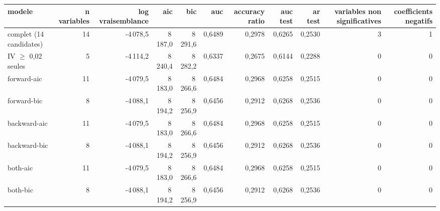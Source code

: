 \begin{tabular}{lrrrrrrrrrr}
\toprule
\textbf{modele} & \textbf{n variables} & \textbf{log vraisemblance} & \textbf{aic} & \textbf{bic} & \textbf{auc} & \textbf{accuracy ratio} & \textbf{auc test} & \textbf{ar test} & \textbf{variables non significatives} & \textbf{coefficients negatifs} \\
\midrule
complet (14 candidates) & 14 & -4\,078,5 & 8\,187,0 & 8\,291,6 & 0,6489 & 0,2978 & 0,6265 & 0,2530 & 3 & 1 \\
IV $\geq$ 0,02 seules & 5 & -4\,114,2 & 8\,240,4 & 8\,282,2 & 0,6337 & 0,2675 & 0,6144 & 0,2288 & 0 & 0 \\
forward-aic & 11 & -4\,079,5 & 8\,183,0 & 8\,266,6 & 0,6484 & 0,2968 & 0,6258 & 0,2515 & 0 & 0 \\
forward-bic & 8 & -4\,088,1 & 8\,194,2 & 8\,256,9 & 0,6456 & 0,2912 & 0,6268 & 0,2536 & 0 & 0 \\
backward-aic & 11 & -4\,079,5 & 8\,183,0 & 8\,266,6 & 0,6484 & 0,2968 & 0,6258 & 0,2515 & 0 & 0 \\
backward-bic & 8 & -4\,088,1 & 8\,194,2 & 8\,256,9 & 0,6456 & 0,2912 & 0,6268 & 0,2536 & 0 & 0 \\
both-aic & 11 & -4\,079,5 & 8\,183,0 & 8\,266,6 & 0,6484 & 0,2968 & 0,6258 & 0,2515 & 0 & 0 \\
both-bic & 8 & -4\,088,1 & 8\,194,2 & 8\,256,9 & 0,6456 & 0,2912 & 0,6268 & 0,2536 & 0 & 0 \\
\bottomrule
\end{tabular}
